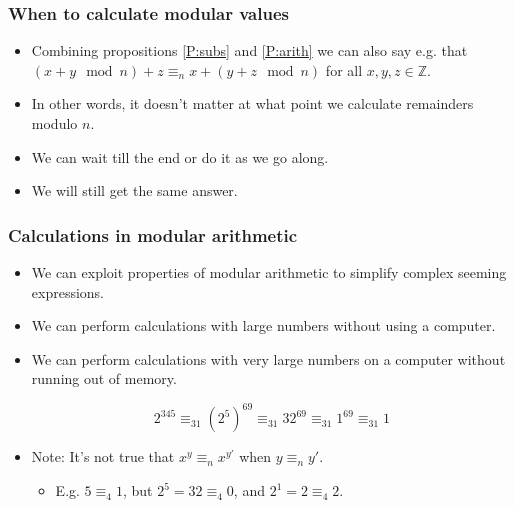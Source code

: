 \documentclass[handout]{beamer}
\newcommand{\bZ}{\mathbb{Z}}
\begin{document}
\begin{frame}
\frametitle{When to calculate modular values}
\begin{itemize}
\item Combining propositions \ref{P:subs} and \ref{P:arith} we can also say e.g. that $(x + y \mod n) + z \equiv_n x + (y + z \mod n)$ for all $x,y,z\in\bZ$. 
\vspace{0.4cm}
\item In other words, it doesn't matter at what point we calculate remainders modulo $n$. 
\vspace{0.4cm}
\item We can wait till the end or do it as we go along. 
\vspace{0.4cm}
\item We will still get the same answer.
\end{itemize}
\end{frame}

\begin{frame}
\frametitle{Calculations in modular arithmetic}
\begin{itemize}
\item We can exploit properties of modular arithmetic to simplify complex seeming expressions.
\vspace{0.2cm}
\item We can perform calculations with large numbers without using a computer.
\vspace{0.2cm}
\item We can perform calculations with very large numbers on a computer without running out of memory.
\vspace{0.2cm}
\begin{example}\label{E:simp}
\[2^{345} \equiv_{31} (2^5)^{69} \equiv_{31} 32^{69} \equiv_{31} 1^{69} \equiv_{31} 1 \]
\end{example} 
\vspace{0.2cm}
\item Note: It's not true that $x^y \equiv_n x^{y'}$ when $y\equiv_n y'$.
\vspace{0.2cm}
\begin{itemize}
\item E.g. $5\equiv_4 1$, but $2^5 = 32 \equiv_4 0$, and $2^1 = 2 \equiv_4 2$.
\end{itemize}
\end{itemize}
\end{frame}
\end{document}
